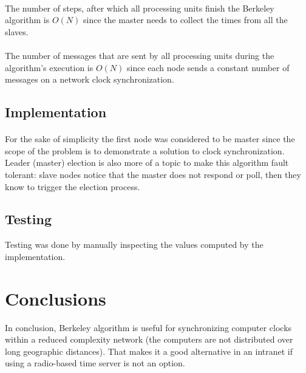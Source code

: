 \documentclass[12pt]{article}
\begin{document}
\paragraph{}
The number of steps, after which all processing units finish the Berkeley algorithm is $O(N)$ since the master needs to collect the times from all the slaves.

\paragraph{}
The number of messages that are sent by all processing units during the algorithm's execution is $O(N)$ since each node sends a constant number of messages on a network clock synchronization.


\subsection{Implementation}
\paragraph{}
For the sake of simplicity the first node was considered to be master since the scope of the problem is to demonstrate a solution to clock synchronization. Leader (master) election is also more of a topic to make this algorithm fault tolerant: slave nodes notice that the master does not respond or poll, then they know to trigger the election process.

\subsection{Testing}
Testing was done by manually inspecting the values computed by the implementation.

\section{Conclusions}
In conclusion, Berkeley algorithm is useful for synchronizing computer clocks within a reduced complexity network (the computers are not distributed over long geographic distances). That makes it a good alternative in an intranet if using a radio-based time server is not an option.

\printbibliography
\end{document}
